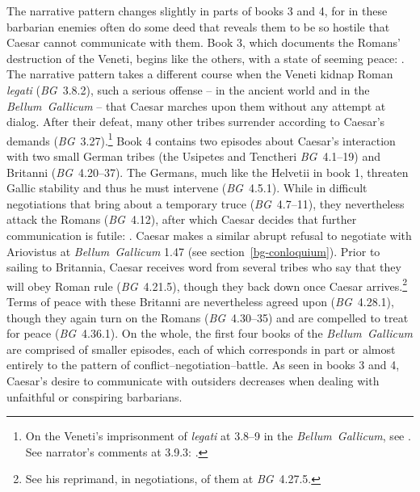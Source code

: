 \documentclass[12pt,letterpaper,oneside,final]{memoir}
\begin{document}
The narrative pattern changes slightly in parts of books 3 and 4, for in these barbarian enemies often do some deed that reveals them to be so hostile that Caesar cannot communicate with them. Book 3, which documents the Romans' destruction of the Veneti, begins like the others, with a state of seeming peace: . The narrative pattern takes a different course when the Veneti kidnap Roman \emph{legati} (\emph{BG}~3.8.2), such a serious offense -- in the ancient world and in the \emph{Bellum~Gallicum} -- that Caesar marches upon them without any attempt at dialog. After their defeat, many other tribes surrender according to Caesar's demands (\emph{BG}~3.27).\footnote{On the Veneti's imprisonment of \emph{legati} at 3.8--9 in the \emph{Bellum~Gallicum}, see \textcite[120]{riggsby2006}. See narrator's comments at 3.9.3: .} Book 4 contains two episodes about Caesar's interaction with two small German tribes (the Usipetes and Tenctheri \emph{BG}~4.1--19) and Britanni (\emph{BG}~4.20--37). The Germans, much like the Helvetii in book 1, threaten Gallic stability and thus he must intervene (\emph{BG}~4.5.1). While in difficult negotiations that bring about a temporary truce (\emph{BG}~4.7--11), they nevertheless attack the Romans (\emph{BG}~4.12), after which Caesar decides that further communication is futile: . Caesar makes a similar abrupt refusal to negotiate with Ariovistus at \emph{Bellum~Gallicum} 1.47 (see section~\ref{bg-conloquium}). Prior to sailing to Britannia, Caesar receives word from several tribes who say that they will obey Roman rule (\emph{BG}~4.21.5), though they back down once Caesar arrives.\footnote{See his reprimand, in negotiations, of them at \emph{BG}~4.27.5.} Terms of peace with these Britanni are nevertheless agreed upon (\emph{BG}~4.28.1), though they again turn on the Romans (\emph{BG}~4.30--35) and are compelled to treat for peace (\emph{BG}~4.36.1). On the whole, the first four books of the \emph{Bellum~Gallicum} are comprised of smaller episodes, each of which corresponds in part or almost entirely to the pattern of conflict--negotiation--battle. As seen in books 3 and 4, Caesar's desire to communicate with outsiders decreases when dealing with unfaithful or conspiring barbarians.
\end{document}
